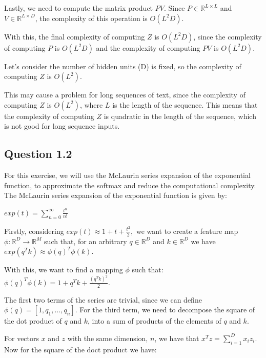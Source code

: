 \documentclass{article}
\begin{document}
\bigskip

Lastly, we need to compute the matrix product $PV$. Since $P \in \mathbb{R}^{L \times L}$ and $V \in \mathbb{R}^{L \times D}$,
the complexity of this operation is $O(L^2D)$.

With this, the final complexity of computing $Z$ is $O(L^2D)$, since the complexity of computing $P$ is $O(L^2D)$ 
and the complexity of computing $PV$ is $O(L^2D)$.

\bigskip

Let's consider the number of hidden units (D) is fixed, so the complexity of computing $Z$ is $O(L^2)$.

This may cause a problem for long sequences of text, since the complexity of computing $Z$ is $O(L^2)$, where $L$ is the length of the sequence.
This means that the complexity of computing $Z$ is quadratic in the length of the sequence, which is not good for long sequence inputs.

\subsection{Question 1.2}

For this exercise, we will use the McLaurin series expansion of the exponential function, to approximate the softmax and reduce the computational 
complexity. The McLaurin series expansion of the exponential function is given by:

\bigskip

$exp(t) = \sum_{n=0}^{\infty} \frac{t^n}{n!}$

\bigskip

Firstly, considering $exp(t) \approx 1 + t + \frac{t^2}{2}, $ we want to create a feature map $\phi: \mathbb{R}^D \rightarrow \mathbb{R}^M$ such that, 
for an arbitrary $q \in \mathbb{R}^D$ and $k \in \mathbb{R}^D$ we have $exp(q^Tk) \approx \phi(q)^T \phi(k)$.

With this, we want to find a mapping $\phi$ such that:
$ \phi(q)^T \phi(k) = 1 + q^Tk + \frac{(q^Tk)^2}{2}$.

\bigskip

The first two terms of the series are trivial, since we can define $\phi(q) = [1, q_1, \dots, q_n]$. 
For the third term, we need to decompose the square of the dot product of $q$ and $k$, into a sum of products of the elements of $q$ and $k$.

For vectors $x$ and $z$ with the same dimension, $n$, we have that $x^Tz = \sum_{i=1}^{D} x_iz_i$.
Now for the square of the doct product we have:
\end{document}
